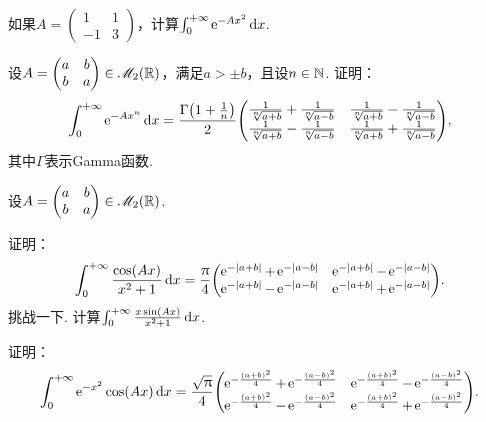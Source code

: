 \begin{mybox}
  \begin{problem}
    \begin{enum}
      \item 如果$A=\begin{pmatrix}
        1 & 1 \\
        -1 & 3
      \end{pmatrix}$，计算$\int_0^{+\infty}\operatorname{\!\!\;\mathrm e}^{-Ax^2}\mathop{}\!\mathrm d x$.
      \item 设$A=\begin{pmatrix}
        a & b \\
        b & a
      \end{pmatrix}\in\mathscr M_2(\mathbb R)$，满足$a>\pm b$，且设$n\in\mathbb N$. 证明：
      \[
        \int_0^{+\infty}\ee^{-Ax^n}\dif x = \frac{\Gamma\left(1+\frac1n\right)}2
        \begin{pmatrix}
          \frac1{\sqrt[n]{a+b}} + \frac1{\sqrt[n]{a-b}} & \frac1{\sqrt[n]{a+b}} - \frac1{\sqrt[n]{a-b}} \\
          \frac1{\sqrt[n]{a+b}} - \frac1{\sqrt[n]{a-b}} &
          \frac1{\sqrt[n]{a+b}} + \frac1{\sqrt[n]{a-b}}
        \end{pmatrix},
      \]
      其中$\Gamma$表示Gamma函数.
    \end{enum}
  \end{problem}
\end{mybox}

\begin{mybox}
  \begin{problem}[该Laplace表演了!]

    设$A=\begin{pmatrix}
      a & b \\
      b & a
    \end{pmatrix}\in\mathscr M_2(\mathbb R)$.
    \begin{enum}
      \item 证明：
      \[
        \int_0^{+\infty} \frac{\cos(Ax)}{x^2+1} \dif x = \frac\pi4 \begin{pmatrix}
          \ee^{-|a+b|} + \ee^{-|a-b|} & \ee^{-|a+b|} - \ee^{-|a-b|} \\
          \ee^{-|a+b|} - \ee^{-|a-b|} & \ee^{-|a+b|} + \ee^{-|a-b|}
        \end{pmatrix}.
      \]
      {\kaishu 挑战一下.} 计算$\int_0^{+\infty}\frac{x\sin(Ax)}{x^2+1}\mathop{}\!\mathrm d x$.
      \item\label{prob4.95b} 证明：
      \[
        \int_0^{+\infty}\ee^{-x^2}\cos(Ax) \dif x = \frac{\sqrt\pi}4 \begin{pmatrix}
          \ee^{-\frac{(a+b)^2}4} + \ee^{-\frac{(a-b)^2}4} & \ee^{-\frac{(a+b)^2}4} - \ee^{-\frac{(a-b)^2}4} \\
          \ee^{-\frac{(a+b)^2}4} -  \ee^{-\frac{(a-b)^2}4} & \ee^{-\frac{(a+b)^2}4} + \ee^{-\frac{(a-b)^2}4}
        \end{pmatrix}.
      \]
    \end{enum}
  \end{problem}
\end{mybox}

